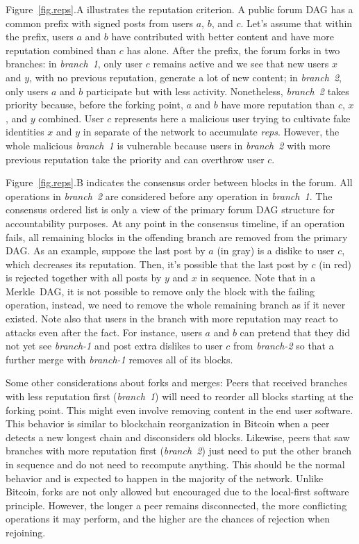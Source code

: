 \documentclass[10pt,journal,compsoc]{IEEEtran}
\newcommand{\reps}     {\emph{reps}\xspace}
\begin{document}
Figure~\ref{fig.reps}.A illustrates the reputation criterion.
A public forum DAG has a common prefix with signed posts from users $a$, $b$,
and $c$.
Let's assume that within the prefix, users $a$ and $b$ have contributed with
better content and have more reputation combined than $c$ has alone.
%
After the prefix, the forum forks in two branches:
in \emph{branch~1}, only user $c$ remains active and we see that new users $x$
and $y$, with no previous reputation, generate a lot of new content;
in \emph{branch~2}, only users $a$ and $b$ participate but with less activity.
Nonetheless, \emph{branch~2} takes priority because, before the forking point,
$a$ and $b$ have more reputation than $c$, $x$, and $y$ combined.
%
User $c$ represents here a malicious user trying to cultivate fake identities
$x$ and $y$ in separate of the network to accumulate \reps.
However, the whole malicious \emph{branch~1} is vulnerable because users in
\emph{branch~2} with more previous reputation take the priority and can
overthrow user $c$.

Figure~\ref{fig.reps}.B indicates the consensus order between blocks in the
forum.
All operations in \emph{branch~2} are considered before any operation in
\emph{branch~1}.
The consensus ordered list is only a view of the primary forum DAG structure
for accountability purposes.
At any point in the consensus timeline, if an operation fails, all remaining
blocks in the offending branch are removed from the primary DAG.
As an example, suppose the last post by $a$ (in gray) is a dislike to user $c$,
which decreases its reputation.
Then, it's possible that the last post by $c$ (in red) is rejected together
with all posts by $y$ and $x$ in sequence.
%
Note that in a Merkle~DAG, it is not possible to remove only the block with the
failing operation, instead, we need to remove the whole remaining branch as if
it never existed.
%
Note also that users in the branch with more reputation may react to attacks
even after the fact.
For instance, users $a$ and $b$ can pretend that they did not yet see
\emph{branch-1} and post extra dislikes to user $c$ from \emph{branch-2} so
that a further merge with \emph{branch-1} removes all of its blocks.

Some other considerations about forks and merges:
%
Peers that received branches with less reputation first (\emph{branch~1}) will
need to reorder all blocks starting at the forking point.
This might even involve removing content in the end user software.
This behavior is similar to blockchain reorganization in Bitcoin when a peer
detects a new longest chain and disconsiders old blocks.
%
Likewise, peers that saw branches with more reputation first (\emph{branch~2})
just need to put the other branch in sequence and do not need to recompute
anything.
This should be the normal behavior and is expected to happen in the majority of
the network.
%
Unlike Bitcoin, forks are not only allowed but encouraged due to the
local-first software principle.
However, the longer a peer remains disconnected, the more conflicting
operations it may perform, and the higher are the chances of rejection when
rejoining.
\end{document}
